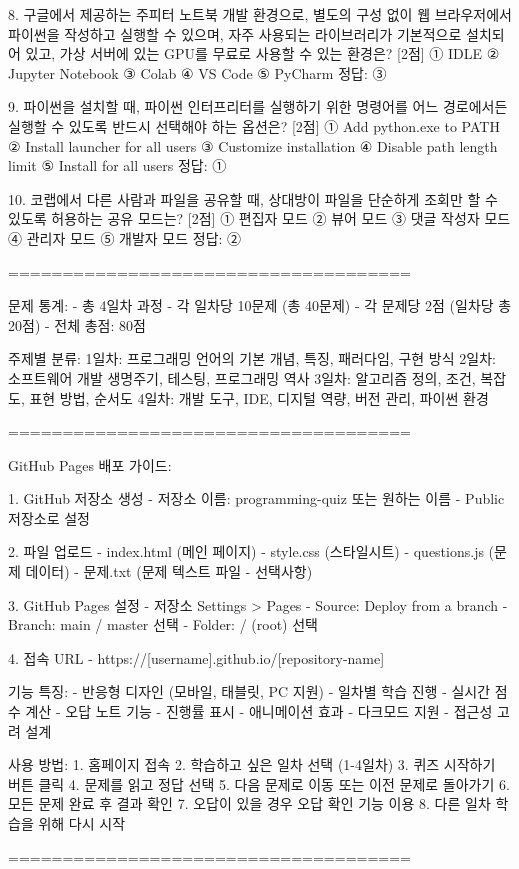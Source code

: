 8. 구글에서 제공하는 주피터 노트북 개발 환경으로, 별도의 구성 없이 웹 브라우저에서 파이썬을 작성하고 실행할 수 있으며, 자주 사용되는 라이브러리가 기본적으로 설치되어 있고, 가상 서버에 있는 GPU를 무료로 사용할 수 있는 환경은? [2점]
① IDLE
② Jupyter Notebook
③ Colab
④ VS Code
⑤ PyCharm
정답: ③

9. 파이썬을 설치할 때, 파이썬 인터프리터를 실행하기 위한 명령어를 어느 경로에서든 실행할 수 있도록 반드시 선택해야 하는 옵션은? [2점]
① Add python.exe to PATH
② Install launcher for all users
③ Customize installation
④ Disable path length limit
⑤ Install for all users
정답: ①

10. 코랩에서 다른 사람과 파일을 공유할 때, 상대방이 파일을 단순하게 조회만 할 수 있도록 허용하는 공유 모드는? [2점]
① 편집자 모드
② 뷰어 모드
③ 댓글 작성자 모드
④ 관리자 모드
⑤ 개발자 모드
정답: ②

=====================================

문제 통계:
- 총 4일차 과정
- 각 일차당 10문제 (총 40문제)
- 각 문제당 2점 (일차당 총 20점)
- 전체 총점: 80점

주제별 분류:
1일차: 프로그래밍 언어의 기본 개념, 특징, 패러다임, 구현 방식
2일차: 소프트웨어 개발 생명주기, 테스팅, 프로그래밍 역사
3일차: 알고리즘 정의, 조건, 복잡도, 표현 방법, 순서도
4일차: 개발 도구, IDE, 디지털 역량, 버전 관리, 파이썬 환경

=====================================

GitHub Pages 배포 가이드:

1. GitHub 저장소 생성
   - 저장소 이름: programming-quiz 또는 원하는 이름
   - Public 저장소로 설정

2. 파일 업로드
   - index.html (메인 페이지)
   - style.css (스타일시트)
   - questions.js (문제 데이터)
   - 문제.txt (문제 텍스트 파일 - 선택사항)

3. GitHub Pages 설정
   - 저장소 Settings > Pages
   - Source: Deploy from a branch
   - Branch: main / master 선택
   - Folder: / (root) 선택

4. 접속 URL
   - https://[username].github.io/[repository-name]

기능 특징:
- 반응형 디자인 (모바일, 태블릿, PC 지원)
- 일차별 학습 진행
- 실시간 점수 계산
- 오답 노트 기능
- 진행률 표시
- 애니메이션 효과
- 다크모드 지원
- 접근성 고려 설계

사용 방법:
1. 홈페이지 접속
2. 학습하고 싶은 일차 선택 (1-4일차)
3. 퀴즈 시작하기 버튼 클릭
4. 문제를 읽고 정답 선택
5. 다음 문제로 이동 또는 이전 문제로 돌아가기
6. 모든 문제 완료 후 결과 확인
7. 오답이 있을 경우 오답 확인 기능 이용
8. 다른 일차 학습을 위해 다시 시작

=====================================